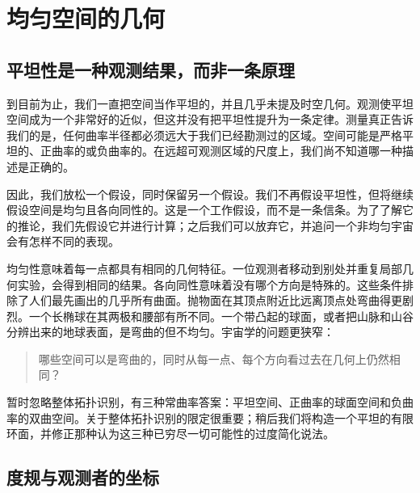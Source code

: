 \chapter{均匀空间的几何}


\section{平坦性是一种观测结果，而非一条原理}

到目前为止，我们一直把空间当作平坦的，并且几乎未提及时空几何。观测使平坦空间成为一个非常好的近似，但这并没有把平坦性提升为一条定律。测量真正告诉我们的是，任何曲率半径都必须远大于我们已经勘测过的区域。空间可能是严格平坦的、正曲率的或负曲率的。在远超可观测区域的尺度上，我们尚不知道哪一种描述是正确的。

因此，我们放松一个假设，同时保留另一个假设。我们不再假设平坦性，但将继续假设空间是均匀且各向同性的。这是一个工作假设，而不是一条信条。为了了解它的推论，我们先假设它并进行计算；之后我们可以放弃它，并追问一个非均匀宇宙会有怎样不同的表现。

均匀性意味着每一点都具有相同的几何特征。一位观测者移动到别处并重复局部几何实验，会得到相同的结果。各向同性意味着没有哪个方向是特殊的。这些条件排除了人们最先画出的几乎所有曲面。抛物面在其顶点附近比远离顶点处弯曲得更剧烈。一个长椭球在其两极和腰部有所不同。一个带凸起的球面，或者把山脉和山谷分辨出来的地球表面，是弯曲的但不均匀。宇宙学的问题更狭窄：
\begin{quote}
哪些空间可以是弯曲的，同时从每一点、每个方向看过去在几何上仍然相同？
\end{quote}

暂时忽略整体拓扑识别，有三种常曲率答案：平坦空间、正曲率的球面空间和负曲率的双曲空间。关于整体拓扑识别的限定很重要；稍后我们将构造一个平坦的有限环面，并修正那种认为这三种已穷尽一切可能性的过度简化说法。

\section{度规与观测者的坐标}

